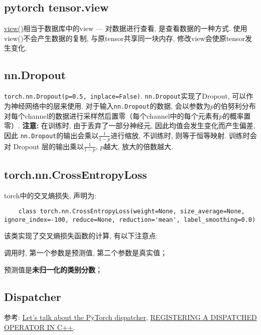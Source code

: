 \subsection{pytorch tensor.view}
\href{https://pytorch.org/docs/stable/tensor_view.html}{view()}相当于数据库中的view --- 对数据进行查看, 是查看数据的一种方式. 使用view()不会产生数据的复制, 与原tensor共享同一块内存, 修改view会使原tensor发生变化. 

\subsection{nn.Dropout}\label{nn_dropout}
\texttt{torch.nn.Dropout(p=0.5, inplace=False)}. \texttt{nn.Dropout}实现了Dropout, 可以作为神经网络中的层来使用. 对于输入\texttt{nn.Dropout}的数据, 会以参数为$p$的伯努利分布对每个channel的数据进行采样然后置零（每个channel中的每个元素有$p$的概率置零）. \textbf{注意: }在训练时, 由于丢弃了一部分神经元, 因此均值会发生变化而产生偏差, 因此 \texttt{nn.Dropout}的输出会乘以$\frac{1}{1 - p}$进行缩放, 不训练时, 则等于恒等映射. 训练时会对 Dropout 层的输出乘以$\frac{1}{1 - p}$, $p$越大, 放大的倍数越大. 

\subsection{torch.nn.CrossEntropyLoss}
torch中的交叉熵损失, 声明为: 
\begin{verbatim}
	class torch.nn.CrossEntropyLoss(weight=None, size_average=None, ignore_index=-100, reduce=None, reduction='mean', label_smoothing=0.0)
\end{verbatim}

该类实现了交叉熵损失函数的计算, 有以下注意点: 
\begin{myitemize}
	\item 调用时, 第一个参数是预测值, 第二个参数是真实值；
	\item 预测值是\textbf{未归一化的类别分数}；
\end{myitemize}


\subsection{Dispatcher}
参考: \href{http://blog.ezyang.com/2020/09/lets-talk-about-the-pytorch-dispatcher/}{Let’s talk about the PyTorch dispatcher}, \href{https://pytorch.org/tutorials/advanced/dispatcher.html}{REGISTERING A DISPATCHED OPERATOR IN C++}.